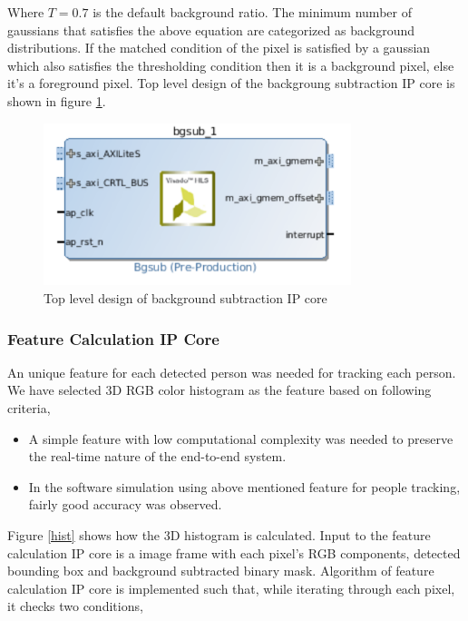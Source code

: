 \documentclass[12pt,a4paper]{report}
\begin{document}
Where $T = 0.7$ is the default background ratio. The minimum number of gaussians that satisfies the above equation are categorized as background distributions. If the matched condition of the pixel is satisfied by a gaussian which also satisfies the thresholding condition then it is a background pixel, else it$’$s a foreground pixel.
Top level design of the backgroung subtraction IP core is shown in figure \ref{gmmip}.

\begin{figure}[H]
\includegraphics[width=0.8\textwidth]{gmmip}
\centering
\caption{Top level design of background subtraction IP core}
\label{gmmip}
\end{figure}

\subsubsection{Feature Calculation IP Core}

An unique feature for each detected person was needed for tracking each person. We have selected 3D RGB color histogram as the feature based on following criteria,
\begin{itemize}
\item A simple feature with low computational complexity was needed to preserve the real-time nature of the end-to-end system.
\item In the software simulation using above mentioned feature for people tracking, fairly good accuracy was observed. 
\end{itemize}

Figure \ref{hist} shows how the 3D histogram is calculated. Input to the feature calculation IP core is a image frame with each pixel's RGB components, detected bounding box and background subtracted binary mask.
Algorithm of feature calculation IP core is implemented such that, while iterating through each pixel, it checks two conditions,
\end{document}
